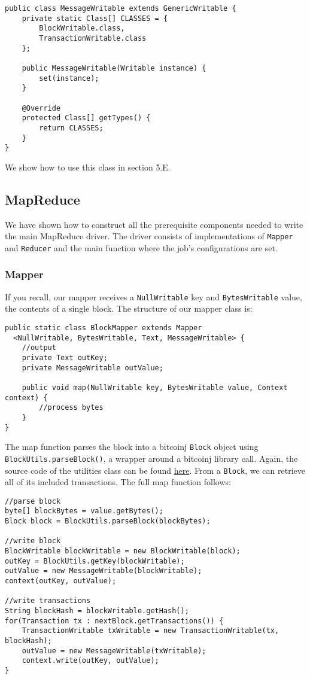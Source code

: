 \documentclass[9pt,twocolumn,twoside]{idsi}
\begin{document}
\begin{lstlisting}
public class MessageWritable extends GenericWritable {
    private static Class[] CLASSES = {
        BlockWritable.class,
        TransactionWritable.class
    };

    public MessageWritable(Writable instance) {
        set(instance);
    }

    @Override
    protected Class[] getTypes() {
        return CLASSES;
    }
}
\end{lstlisting}

We show how to use this class in section 5.E.

\subsection{MapReduce}
We have shown how to construct all the prerequisite components needed to write the main MapReduce driver. The driver consists of implementations of \lstinline{Mapper} and \lstinline{Reducer} and the main function where the job's configurations are set.

\subsubsection{Mapper}
If you recall, our mapper receives a \lstinline{NullWritable} key and \lstinline{BytesWritable} value, the contents of a single block. The structure of our mapper class is:
\begin{lstlisting}
public static class BlockMapper extends Mapper
  <NullWritable, BytesWritable, Text, MessageWritable> {
    //output
    private Text outKey;
    private MessageWritable outValue;

    public void map(NullWritable key, BytesWritable value, Context context) {
        //process bytes
    }
}
\end{lstlisting}
The map function parses the block into a bitcoinj \lstinline{Block} object using \lstinline{BlockUtils.parseBlock()}, a wrapper around a bitcoinj library call. Again, the source code of the utilities class can be found \href{https://google.com}{here}. From a \lstinline{Block}, we can retrieve all of its included transactions. The full map function follows:

\begin{lstlisting}
//parse block
byte[] blockBytes = value.getBytes();
Block block = BlockUtils.parseBlock(blockBytes);

//write block
BlockWritable blockWritable = new BlockWritable(block);
outKey = BlockUtils.getKey(blockWritable);
outValue = new MessageWritable(blockWritable);
context(outKey, outValue);

//write transactions
String blockHash = blockWritable.getHash();
for(Transaction tx : nextBlock.getTransactions()) {
    TransactionWritable txWritable = new TransactionWritable(tx, blockHash);
    outValue = new MessageWritable(txWritable);
    context.write(outKey, outValue);
}
\end{lstlisting}
\end{document}
